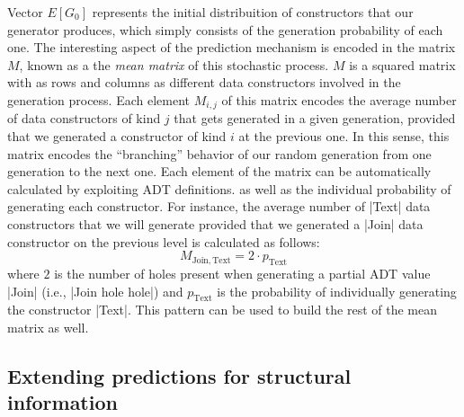Vector $E[G_0]$ represents the initial distribuition of constructors that our
generator produces, which simply consists of the generation probability of each
one.
%
The interesting aspect of the prediction mechanism is encoded in the matrix $M$,
known as a the \emph{mean matrix} of this stochastic process.
%
$M$ is a squared matrix with as rows and columns as different data constructors
involved in the generation process.
%
Each element $M_{i,j}$ of this matrix encodes the average number of data
constructors of kind $j$ that gets generated in a given generation, provided that we
generated a constructor of kind $i$ at the previous one.
%
In this sense, this matrix encodes the ``branching'' behavior of our random
generation from one generation to the next one.
%
Each element of the matrix can be automatically calculated by exploiting ADT
definitions. %
%
%
as well as the individual probability of generating each constructor.
%
For instance, the average number of |Text| data constructors that we will
generate provided that we generated a |Join| data constructor on the previous
level is calculated as follows:
%
$$ M_{\mathrm{Join, Text}} = 2\cdot p_{\mathrm{Text}} $$
%
where $2$ is the number of holes present when generating a partial ADT value
|Join| (i.e., |Join hole hole|) and $p_{\mathrm{Text}}$ is the probability of
individually generating the constructor |Text|.
%
This pattern can be used to build the rest of the mean matrix as well.



\subsection{Extending predictions for structural information}

